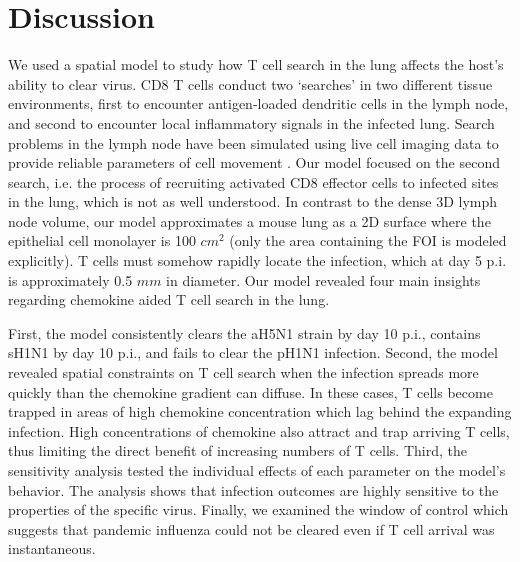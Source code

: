 \documentclass[preprint,10pt,numbers]{elsarticle}
\begin{document}
\section*{Discussion}

We used a spatial model to study how T cell search in the lung affects the host's ability to clear virus.  CD8 T cells conduct two `searches' in two different tissue environments, first to encounter antigen-loaded dendritic cells in the lymph node, and second to encounter local inflammatory signals in the infected lung.  Search problems in the lymph node have been simulated using live cell imaging data to provide reliable parameters of cell movement \citep{Mirsky2011, Vroomans2012}.  Our model focused on the second search, i.e. the process of recruiting activated CD8 effector cells to infected sites in the lung, which is not as well understood.  In contrast to the dense 3D lymph node volume, our model approximates a mouse lung as a 2D surface where the epithelial cell monolayer is 100 $cm^2$ (only the area containing the FOI is modeled explicitly).  T cells must somehow rapidly locate the infection, which at day 5 p.i. is approximately 0.5 $mm$ in diameter.  Our model revealed four main insights regarding chemokine aided T cell search in the lung.

First, %
the model consistently clears the aH5N1 strain by day 10 p.i., contains sH1N1 by day 10 p.i., and fails to clear the pH1N1 infection.  Second, the model revealed spatial constraints on T cell search when the infection spreads more quickly than the chemokine gradient can diffuse.  In these cases, T cells become trapped in areas of high chemokine concentration which lag behind the expanding infection.  High concentrations of chemokine also attract and trap arriving T cells, thus limiting the direct benefit of increasing numbers of T cells. Third, the sensitivity analysis tested the individual effects of each parameter on the model's behavior.  The analysis shows that infection outcomes are highly sensitive to the properties of the specific virus.
Finally, we examined the window of control which suggests that pandemic influenza could not be cleared even if T cell arrival was instantaneous.  


\end{document}
